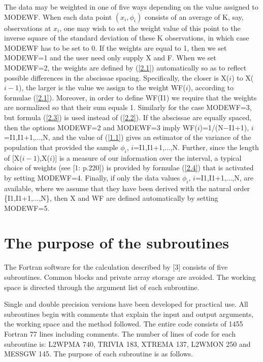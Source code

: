 \documentclass[acmtoms]{acmtrans2m}
\begin{document}
The data may be weighted in one of five ways depending on the value assigned
to MODEWF. When each data point $(x_{i},\phi _{i})$ consists of an average
of K, say, observations at $x_{i}$, one may wish to set the weight value of
this point to the inverse square of the standard deviation of these K
observations, in which case MODEWF has to be set to 0. If the weights are
equal to 1, then we set MODEWF=1 and the user need only supply X and F. When
we set MODEWF=2, the weights are defined by (\ref{2.1}) automatically so as
to reflect possible differences in the abscissae spacing. Specifically, the
closer is X($i$) to X($i-1$), the larger is the value we assign to the
weight WF($i$), according to formulae (\ref{2.1}). Moreover, in order to
define WF(I1) we require that the weights are normalized so that their sum
equals 1. Similarly for the case MODEWF=3, but formula (\ref{2.3}) is used
instead of (\ref{2.2}). If the abscissae are equally spaced, then the
options MODEWF=2 and MODEWF=3 imply WF($i$)=1/(N$-$I1+1), $i$=I1,I1+1,...,N,
and the value of (\ref{1.1}) gives an estimator of the variance of the
population that provided the sample $\phi _{i}$, $i$=I1,I1+1,...,N. Further,
since the length of [X($i-1$),X($i$)] is a measure of our information over
the interval, a typical choice of weights (see [1: p.220]) is provided by
formulae (\ref{2.4}) that is activated by setting MODEWF=4. Finally, if only
the data values $\phi _{i}$, $i$=I1,I1+1,...,N, are available, where we
assume that they have been derived with the natural order \{I1,I1+1,...,N\},
then X and WF are defined automatically by setting MODEWF=5.

\section{The purpose of the subroutines}

The Fortran software for the calculation described by [3] consists of five
subroutines. Common blocks and private array storage are avoided. The
working space is directed through the argument list of each subroutine.

Single and double precision versions have been developed for practical use.
All subroutines begin with comments that explain the input and output
arguments, the working space and the method followed. The entire code
consists of 1455 Fortran 77 lines including comments. The number of lines of
code for each subroutine is: L2WPMA 740, TRIVIA 183, XTREMA 137, L2WMON 250
and MESSGW 145. The purpose of each subroutine is as follows.
\end{document}
